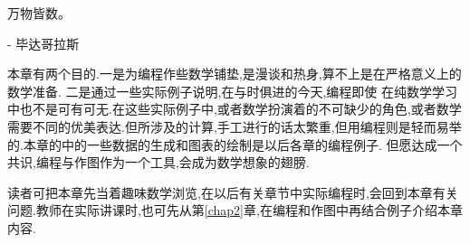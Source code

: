 \documentclass[main.tex]{subfiles}
\begin{document}
\begin{flushright}
	\begin{kaishu}
		万物皆数。\\
	\end{kaishu}
	- 毕达哥拉斯
\end{flushright}

本章有两个目的.一是为编程作些数学铺垫,是漫谈和热身,算不上是在严格意义上的数学准备.
二是通过一些实际例子说明,在与时俱进的今天,编程即使
在纯数学学习中也不是可有可无.在这些实际例子中,或者数学扮演着的不可缺少的角色,或者数学需要不同的优美表达.但所涉及的计算,手工进行的话太繁重,但用编程则是轻而易举的.本章的中的一些数据的生成和图表的绘制是以后各章的编程例子.
但愿达成一个共识,编程与作图作为一个工具,会成为数学想象的翅膀.

读者可把本章先当着趣味数学浏览,在以后有关章节中实际编程时,会回到本章有关问题.教师在实际讲课时,也可先从第\ref{chap2}章,在编程和作图中再结合例子介绍本章内容.
\end{document}
